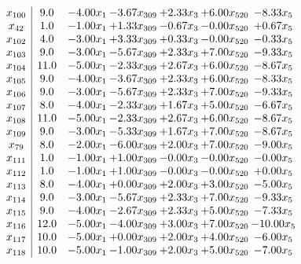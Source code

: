 \documentclass[8pt]{article}
\begin{document}
\[\begin{array}{c| c c@{\hskip 2pt} c@{\hskip 2pt} c@{\hskip 2pt} c@{\hskip 2pt} c@{\hskip 2pt} }
 x_{100}   &  9.0 & -4.00 x_{1} & -3.67 x_{309} & +  2.33 x_{3} & +  6.00 x_{520} & -8.33 x_{5}\\
 x_{42}   &  1.0 & -1.00 x_{1} & +  1.33 x_{309} & -0.67 x_{3} & -0.00 x_{520} & +  0.67 x_{5}\\
 x_{102}   &  4.0 & -3.00 x_{1} & +  3.33 x_{309} & +  0.33 x_{3} & -0.00 x_{520} & -0.33 x_{5}\\
 x_{103}   &  9.0 & -3.00 x_{1} & -5.67 x_{309} & +  2.33 x_{3} & +  7.00 x_{520} & -9.33 x_{5}\\
 x_{104}   &  11.0 & -5.00 x_{1} & -2.33 x_{309} & +  2.67 x_{3} & +  6.00 x_{520} & -8.67 x_{5}\\
 x_{105}   &  9.0 & -4.00 x_{1} & -3.67 x_{309} & +  2.33 x_{3} & +  6.00 x_{520} & -8.33 x_{5}\\
 x_{106}   &  9.0 & -3.00 x_{1} & -5.67 x_{309} & +  2.33 x_{3} & +  7.00 x_{520} & -9.33 x_{5}\\
 x_{107}   &  8.0 & -4.00 x_{1} & -2.33 x_{309} & +  1.67 x_{3} & +  5.00 x_{520} & -6.67 x_{5}\\
 x_{108}   &  11.0 & -5.00 x_{1} & -2.33 x_{309} & +  2.67 x_{3} & +  6.00 x_{520} & -8.67 x_{5}\\
 x_{109}   &  9.0 & -3.00 x_{1} & -5.33 x_{309} & +  1.67 x_{3} & +  7.00 x_{520} & -8.67 x_{5}\\
 x_{79}   &  8.0 & -2.00 x_{1} & -6.00 x_{309} & +  2.00 x_{3} & +  7.00 x_{520} & -9.00 x_{5}\\
 x_{111}   &  1.0 & -1.00 x_{1} & +  1.00 x_{309} & -0.00 x_{3} & -0.00 x_{520} & -0.00 x_{5}\\
 x_{112}   &  1.0 & -1.00 x_{1} & +  1.00 x_{309} & -0.00 x_{3} & -0.00 x_{520} & +  0.00 x_{5}\\
 x_{113}   &  8.0 & -4.00 x_{1} & +  0.00 x_{309} & +  2.00 x_{3} & +  3.00 x_{520} & -5.00 x_{5}\\
 x_{114}   &  9.0 & -3.00 x_{1} & -5.67 x_{309} & +  2.33 x_{3} & +  7.00 x_{520} & -9.33 x_{5}\\
 x_{115}   &  9.0 & -4.00 x_{1} & -2.67 x_{309} & +  2.33 x_{3} & +  5.00 x_{520} & -7.33 x_{5}\\
 x_{116}   &  12.0 & -5.00 x_{1} & -4.00 x_{309} & +  3.00 x_{3} & +  7.00 x_{520} & -10.00 x_{5}\\
 x_{117}   &  10.0 & -5.00 x_{1} & +  0.00 x_{309} & +  2.00 x_{3} & +  4.00 x_{520} & -6.00 x_{5}\\
 x_{118}   &  10.0 & -5.00 x_{1} & -1.00 x_{309} & +  2.00 x_{3} & +  5.00 x_{520} & -7.00 x_{5}\\

\end{array}\]
\end{document}
